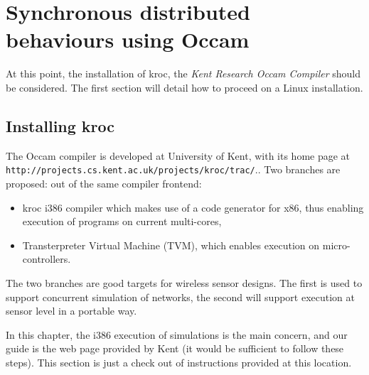 \documentclass[times]{book}
\begin{document}
\chapter {Synchronous distributed  behaviours using Occam}

At this point, the installation of kroc, the {\sl Kent Research Occam Compiler}
should be considered. The first section will detail how to proceed on a Linux
installation.

\section{Installing kroc}

The Occam compiler is developed at University of Kent, with its home page at
{\tt http://projects.cs.kent.ac.uk/projects/kroc/trac/}.. Two branches are proposed:
out of the same compiler frontend:
\begin{itemize}
\item kroc i386 compiler which makes use of a code generator for x86, thus enabling execution
of programs on current multi-cores,
\item Transterpreter Virtual Machine (TVM), which enables execution on micro-controllers.
\end{itemize}

The two branches are good targets for wireless sensor designs. The first is used
to support concurrent simulation of networks, the second will support execution 
at sensor level in a portable way.

In this chapter, the i386 execution of simulations is the main concern, and our guide 
is the web page provided by Kent (it would be sufficient to follow these steps).
This section is just a check out of instructions provided at this location.
\end{document}
